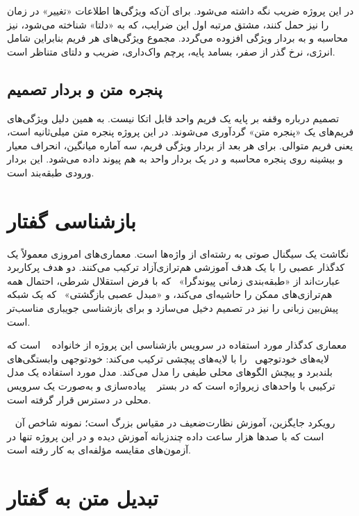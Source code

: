 در این پروژه  ضریب نگه داشته می‌شود. برای آن‌که ویژگی‌ها اطلاعات
«تغییر» در زمان را نیز حمل کنند، مشتق مرتبه اول این ضرایب، که به
«دلتا» شناخته می‌شود، نیز محاسبه و به بردار ویژگی افزوده می‌گردد. مجموع
ویژگی‌های هر فریم بنابراین شامل انرژی، نرخ گذر از صفر، بسامد پایه، پرچم
واک‌داری،  ضریب  و  دلتای متناظر است.

\subsection{پنجره متن و بردار تصمیم}

تصمیم درباره وقفه بر پایه یک فریم واحد قابل اتکا نیست. به همین دلیل
ویژگی‌های فریم‌های یک «پنجره متن» گرد‌آوری می‌شوند. در این پروژه پنجره
متن  میلی‌ثانیه است، یعنی  فریم متوالی. برای هر بعد از بردار
ویژگی فریم، سه آماره میانگین، انحراف معیار و بیشینه روی پنجره محاسبه و در
یک بردار واحد به هم پیوند داده می‌شود. این بردار ورودی طبقه‌بند است.

\section{بازشناسی گفتار}
\label{sec:asr}

 نگاشت یک سیگنال صوتی به رشته‌ای از واژه‌ها است.
معماری‌های امروزی معمولاً یک کدگذار عصبی را با یک هدف آموزشی هم‌ترازی‌آزاد
ترکیب می‌کنند. دو هدف پرکاربرد عبارت‌اند از
«طبقه‌بندی زمانی پیوندگرا»~\cite{graves2006ctc} که با فرض استقلال شرطی، احتمال همه
هم‌ترازی‌های ممکن را حاشیه‌ای می‌کند، و
«مبدل عصبی بازگشتی»~\cite{graves2012rnnt}
که یک شبکه پیش‌بین زبانی را نیز در تصمیم دخیل می‌سازد و برای بازشناسی
جویباری مناسب‌تر است.

معماری کدگذار مورد استفاده در سرویس بازشناسی این پروژه از خانواده
~\cite{gulati2020conformer} است که لایه‌های
خودتوجهی~\cite{vaswani2017attention} را با لایه‌های
پیچشی ترکیب می‌کند: خودتوجهی وابستگی‌های بلندبرد و پیچش الگوهای محلی طیفی را
مدل می‌کند. مدل مورد استفاده یک مدل ترکیبی  با واحدهای زیرواژه
است که در بستر ~\cite{kuchaiev2019nemo} پیاده‌سازی و به‌صورت یک
سرویس محلی در دسترس قرار گرفته است.

رویکرد جایگزین، آموزش نظارت‌ضعیف در مقیاس بزرگ است؛ نمونه شاخص آن
~\cite{radford2023whisper} است که با صدها هزار ساعت داده
چند‌زبانه آموزش دیده و در این پروژه تنها در آزمون‌های مقایسه مؤلفه‌ای به کار
رفته است.

\section{تبدیل متن به گفتار}
\label{sec:tts}

